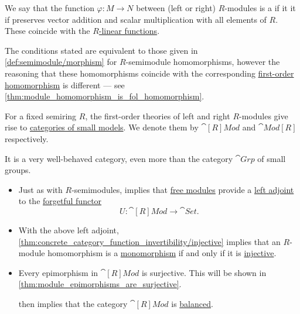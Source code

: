 \begin{definition}
\begin{thmenum}
     We say that the function \( \varphi: M \to N \) between (left or right) \( R \)-modules is a  if it it if preserves vector addition and scalar multiplication with all elements of \( R \). These coincide with the \hyperref[def:linear_function]{\( R \)-linear functions}.

    The conditions stated are equivalent to those given in \cref{def:semimodule/morphism} for \( R \)-semimodule homomorphisms, however the reasoning that these homomorphisms coincide with the corresponding \hyperref[def:fol_homomorphism]{first-order homomorphism} is different --- see \cref{thm:module_homomorphism_is_fol_homomorphism}.

     For a fixed semiring \( R \), the first-order theories of left and right \( R \)-modules give rise to \hyperref[def:fol_theory_model_functor/obj]{categories of small models}. We denote them by \( \cat[R]{Mod} \) and \( \cat{Mod}[R] \) respectively.

    It is a very well-behaved category, even more than the category \hyperref[def:group/category]{\( \cat{Grp} \)} of small groups.
    \begin{itemize}
      \item Just as with \( R \)-semimodules,  implies that \hyperref[def:free_semimodule]{free modules} provide a \hyperref[def:adjoint_functor]{left adjoint} to the \hyperref[def:fol_theory_forgetful_functor/set]{forgetful functor}
      \begin{equation*}
        U: \cat[R]{Mod} \to \cat{Set}.
      \end{equation*}

      \item With the above left adjoint, \cref{thm:concrete_category_function_invertibility/injective} implies that an \( R \)-module homomorphism is a \hyperref[def:morphism_cancellation/left]{monomorphism} if and only if it is \hyperref[def:function_invertibility/injective]{injective}.

      \item Every epimorphism in \( \cat[R]{Mod} \) is surjective. This will be shown in \cref{thm:module_epimorphisms_are_surjective}.

       then implies that the category \( \cat[R]{Mod} \) is \hyperref[def:balanced_category]{balanced}.


\end{itemize}
\end{thmenum}
\end{definition}
